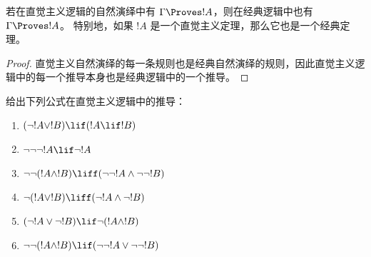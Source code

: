 \documentclass[../../../include/open-logic-section]{subfiles}
\begin{document}
\begin{prop}
  若在直觉主义逻辑的自然演绎中有 $\Gamma \Proves !A$，则在经典逻辑中也有 $\Gamma \Proves !A$。
  特别地，如果 $!A$ 是一个直觉主义定理，那么它也是一个经典定理。
\end{prop}

\begin{proof}
  直觉主义自然演绎的每一条规则也是经典自然演绎的规则，因此直觉主义逻辑中的每一个推导本身也是经典逻辑中的一个推导。
\end{proof}

\begin{prob}
  给出下列公式在直觉主义逻辑中的推导：
  \begin{enumerate}
    \item $(\lnot !A \lor !B) \lif (!A \lif !B)$
    \item $\lnot\lnot\lnot !A \lif \lnot !A$
    \item $\lnot\lnot (!A \land !B) \liff (\lnot\lnot !A\land \lnot \lnot !B)$
    \item $\lnot (!A \lor !B) \liff (\lnot !A \land \lnot !B)$
    \item $(\lnot !A \lor \lnot !B) \lif \lnot (!A \land !B)$
    \item $\lnot\lnot ( !A \land !B) \lif  (\lnot\lnot !A \lor
    \lnot\lnot !B)$
  \end{enumerate}
\end{prob}
\end{document}
